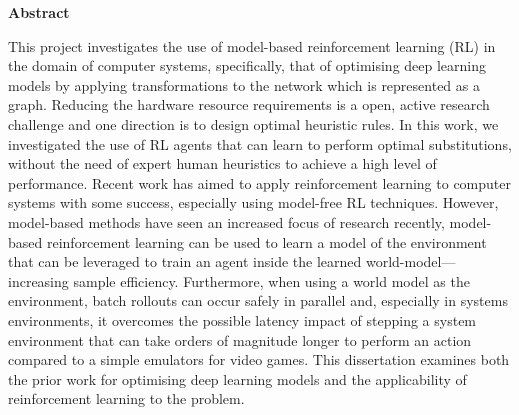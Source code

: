 \newpage
{\Huge \bf Abstract}
\vspace{24pt} 

This project investigates the use of model-based reinforcement learning (RL) in the domain of computer systems, specifically, that of optimising deep learning models by applying transformations to the network which is represented as a graph. Reducing the hardware resource requirements is a open, active research challenge and one direction is to design optimal heuristic rules. In this work, we investigated the use of RL agents that can learn to perform optimal substitutions, without the need of expert human heuristics to achieve a high level of performance. Recent work has aimed to apply reinforcement learning to computer systems with some success, especially using model-free RL techniques. However, model-based methods have seen an increased focus of research recently, model-based reinforcement learning can be used to learn a model of the environment that can be leveraged to train an agent inside the learned world-model---increasing sample efficiency. Furthermore, when using a world model as the environment, batch rollouts can occur safely in parallel and, especially in systems environments, it overcomes the possible latency impact of stepping a system environment that can take orders of magnitude longer to perform an action compared to a simple emulators for video games. This dissertation examines both the prior work for optimising deep learning models and the applicability of reinforcement learning to the problem.

\vspace*{\fill}
